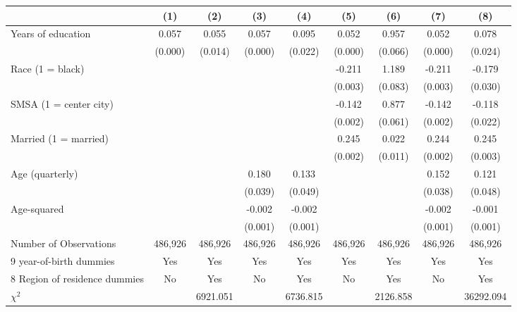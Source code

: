 {
\def\sym#1{\ifmmode^{#1}\else\(^{#1}\)\fi}
\begin{tabular}{l*{8}{c}}
\hline\hline
                    &\multicolumn{1}{c}{(1)}&\multicolumn{1}{c}{(2)}&\multicolumn{1}{c}{(3)}&\multicolumn{1}{c}{(4)}&\multicolumn{1}{c}{(5)}&\multicolumn{1}{c}{(6)}&\multicolumn{1}{c}{(7)}&\multicolumn{1}{c}{(8)}\\
\hline
Years of education  &       0.057&       0.055&       0.057&       0.095&       0.052&       0.957&       0.052&       0.078\\
                    &     (0.000)&     (0.014)&     (0.000)&     (0.022)&     (0.000)&     (0.066)&     (0.000)&     (0.024)\\
Race (1 = black)    &            &            &            &            &      -0.211&       1.189&      -0.211&      -0.179\\
                    &            &            &            &            &     (0.003)&     (0.083)&     (0.003)&     (0.030)\\
SMSA (1 = center city)&            &            &            &            &      -0.142&       0.877&      -0.142&      -0.118\\
                    &            &            &            &            &     (0.002)&     (0.061)&     (0.002)&     (0.022)\\
Married (1 = married)&            &            &            &            &       0.245&       0.022&       0.244&       0.245\\
                    &            &            &            &            &     (0.002)&     (0.011)&     (0.002)&     (0.003)\\
Age (quarterly)     &            &            &       0.180&       0.133&            &            &       0.152&       0.121\\
                    &            &            &     (0.039)&     (0.049)&            &            &     (0.038)&     (0.048)\\
Age-squared         &            &            &      -0.002&      -0.002&            &            &      -0.002&      -0.001\\
                    &            &            &     (0.001)&     (0.001)&            &            &     (0.001)&     (0.001)\\
\hline
Number of Observations&     486,926&     486,926&     486,926&     486,926&     486,926&     486,926&     486,926&     486,926\\
9 year-of-birth dummies&         Yes&         Yes&         Yes&         Yes&         Yes&         Yes&         Yes&         Yes\\
8 Region of residence dummies&          No&         Yes&          No&         Yes&          No&         Yes&          No&         Yes\\
$\chi^2$            &            &    6921.051&            &    6736.815&            &    2126.858&            &   36292.094\\
\hline\hline
\end{tabular}
}
